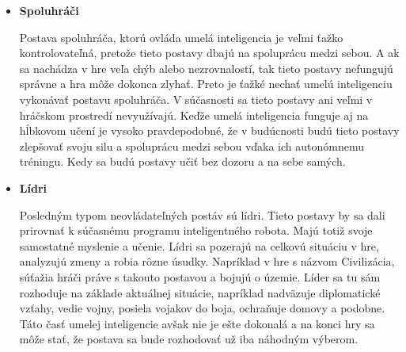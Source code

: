 \documentclass[10pt,twoside,slovak,a4paper]{article}
\begin{document}
\begin{itemize}
\item \textbf{Spoluhráči}

\quad Postava spoluhráča, ktorú ovláda umelá inteligencia je veľmi ťažko kontrolovateľná, pretože tieto postavy dbajú na spoluprácu medzi sebou. A ak sa nachádza v hre veľa chýb alebo nezrovnalostí, tak tieto postavy nefungujú správne a hra môže dokonca zlyhať. Preto je ťažké nechať umelú inteligenciu vykonávať postavu spoluhráča. V súčasnosti sa tieto postavy ani veľmi v hráčskom prostredí nevyužívajú. Keďže umelá inteligencia funguje aj na hĺbkovom učení je vysoko pravdepodobné, že v budúcnosti budú tieto postavy zlepšovať svoju silu a spoluprácu medzi sebou vďaka ich autonómnemu tréningu. Kedy sa budú postavy učiť bez dozoru a na sebe samých.

\item \textbf{Lídri}

\quad Posledným typom neovládateľných postáv sú lídri. Tieto postavy by sa dali prirovnať k súčasnému programu inteligentného robota. Majú totiž svoje samostatné myslenie a učenie. Lídri sa pozerajú na celkovú situáciu v hre, analyzujú zmeny a robia rôzne úsudky. Napríklad v hre s názvom Civilizácia, súťažia hráči práve s takouto postavou a bojujú o územie. Líder sa tu sám rozhoduje na základe aktuálnej situácie, napríklad nadväzuje diplomatické vzťahy, vedie vojny, posiela vojakov do boja, ochraňuje domovy a podobne. Táto časť umelej inteligencie avšak nie je ešte dokonalá a na konci hry sa môže stať, že postava sa bude rozhodovať už iba náhodným výberom. 

\end{itemize}
\end{document}
